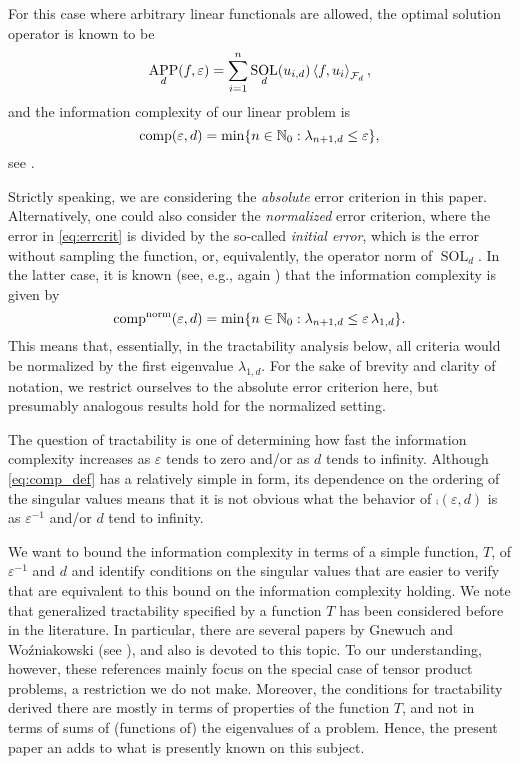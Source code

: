 \documentclass[sort&compress]{elsarticle}
\DeclareMathOperator{\SOL}{SOL}
\DeclareMathOperator{\APP}{APP}
\begin{document}
For this case where arbitrary linear functionals are allowed, the optimal solution operator is known to be
\[
\APP_d(f,\varepsilon) = \sum_{i=1}^n \SOL_d(u_{i,d}) \ip[\cf_d]{f}{u_i},
\]
and the information complexity of our linear problem is
\begin{equation}\label{eq:comp_def}
\operatorname{comp}(\varepsilon, d) = \min \{n \in \mathbb{N}_{0} : \lambda_{n+1, d} \le \varepsilon\},
\end{equation}
see \cite{NovWoz08a}.

Strictly speaking, we are considering the \textit{absolute} error criterion in this paper.
Alternatively, one could also consider the \textit{normalized} error criterion, where the error in \eqref{eq:errcrit} is divided by the so-called \textit{initial error}, which is the error without sampling the function, or, equivalently, the operator norm of $\SOL_d$. In the latter case, it is known (see, e.g., again \cite{NovWoz08a}) that the information complexity is given by
\[
\operatorname{comp}^{\rm norm}(\varepsilon, d) = \min \{n \in \mathbb{N}_{0} : \lambda_{n+1, d} \le \varepsilon\, \lambda_{1, d}\}.
\]
This means that, essentially, in the tractability analysis below, all criteria would be normalized by the first eigenvalue $\lambda_{1,d}$. For the sake of brevity and clarity of notation, we restrict ourselves to the absolute error criterion here, but presumably analogous results hold for the normalized setting.

The question of tractability is one of determining how fast the information complexity increases as $\varepsilon$ tends to zero and/or as $d$ tends to infinity.  Although \eqref{eq:comp_def} has a relatively simple in form, its dependence on the ordering of the singular values means that it is not obvious what the behavior of $\comp(\varepsilon, d)$ is as $\varepsilon^{-1}$ and/or $d$ tend to infinity.

We want to bound the information complexity in terms of a simple function, $T$, of $\varepsilon^{-1}$ and $d$ and identify conditions on the singular values that are easier to verify that are equivalent to this bound on the information complexity holding. We note that generalized tractability specified by a function $T$ has been considered before in the literature. In particular, there are several papers by Gnewuch and Wo\'{z}niakowski (see \cite{GW06,GW08,GW09,GneWoz11a}), and also \cite[Chapter 8]{NovWoz08a} is devoted to this topic. To our understanding, however, these references mainly focus on the special case of tensor product problems, a restriction we do not make.  Moreover, the conditions for tractability derived there are mostly in terms of properties of the function $T$, and not in terms of sums of (functions of) the eigenvalues of a problem. Hence, the present paper an adds to what is presently known on this subject.
\end{document}
